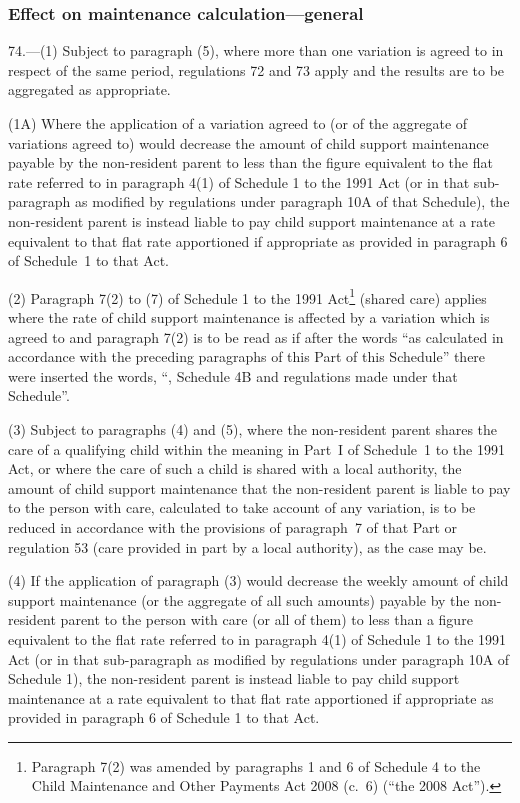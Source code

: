 \documentclass[12pt,a4paper]{article}
\begin{document}
\subsubsection[74. Effect on maintenance calculation---general]{Effect on maintenance calculation---general}

74.---(1)  Subject to paragraph (5), where more than one variation is agreed to in respect of the same period, regulations 72 and 73 apply and the results are to be aggregated as appropriate.

(1A) Where the application of a variation agreed to (or of the aggregate of variations agreed to) would decrease the amount of child support maintenance payable by the non-resident parent to less than the figure equivalent to the flat rate referred to in paragraph 4(1) of Schedule 1 to the 1991 Act (or in that sub-paragraph as modified by regulations under paragraph 10A of that Schedule), the non-resident parent is instead liable to pay child support maintenance at a rate equivalent to that flat rate apportioned if appropriate as provided in paragraph 6 of Schedule~1 to that Act.

(2) Paragraph 7(2) to (7) of Schedule 1 to the 1991 Act\footnote{Paragraph 7(2) was amended by paragraphs 1 and 6 of Schedule 4 to the Child Maintenance and Other Payments Act 2008 (c.~6) (“the 2008 Act”).} (shared care) applies where the rate of child support maintenance is affected by a variation which is agreed to and paragraph 7(2) is to be read as if after the words “as calculated in accordance with the preceding paragraphs of this Part of this Schedule” there were inserted the words, “, Schedule 4B and regulations made under that Schedule”.

(3) Subject to paragraphs (4) and (5), where the non-resident parent shares the care of a qualifying child within the meaning in Part~I of Schedule~1 to the 1991 Act, or where the care of such a child is shared with a local authority, the amount of child support maintenance that the non-resident parent is liable to pay to the person with care, calculated to take account of any variation, is to be reduced in accordance with the provisions of paragraph~7 of that Part or regulation 53 (care provided in part by a local authority), as the case may be.

(4) If the application of paragraph (3) would decrease the weekly amount of child support maintenance (or the aggregate of all such amounts) payable by the non-resident parent to the person with care (or all of them) to less than a figure equivalent to the flat rate referred to in paragraph 4(1) of Schedule 1 to the 1991 Act (or in that sub-paragraph as modified by regulations under paragraph 10A of Schedule 1), the non-resident parent is instead liable to pay child support maintenance at a rate equivalent to that flat rate apportioned if appropriate as provided in paragraph 6 of Schedule 1 to that Act.
\end{document}
